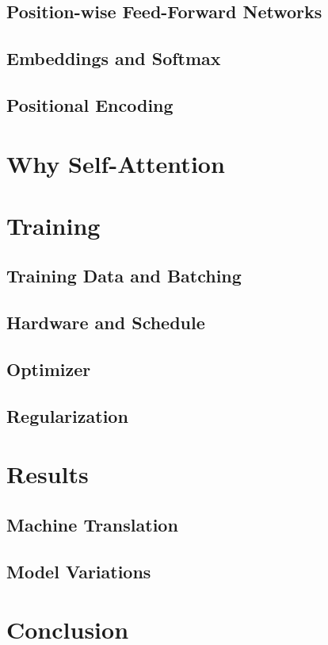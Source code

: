 \documentclass[twocolumn]{jarticle}     %
\begin{document}
\subsection{Position-wise Feed-Forward Networks}

\subsection{Embeddings and Softmax}

\subsection{Positional Encoding}

\section{Why Self-Attention}

\section{Training}

\subsection{Training Data and Batching}

\subsection{Hardware and Schedule}

\subsection{Optimizer}

\subsection{Regularization}

\section{Results}

\subsection{Machine Translation}

\subsection{Model Variations}

\section{Conclusion}




\end{document}
